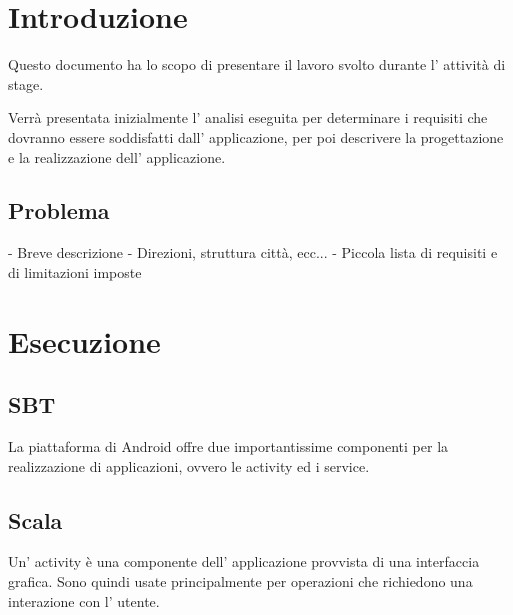 \documentclass{article}
\newcommand{\Versione}{1.0}
\begin{document}
\tableofcontents 
\listoftables
\listoffigures
\newpage

\pagestyle{fancy}

\chead{}
\rhead{
	\color{black}
	\bfseries \textsf{\normalsize v.\Versione\\} 
}
\section{Introduzione}
Questo documento ha lo scopo di presentare il lavoro svolto durante l\textquoteright{} attivit\`{a} di stage. 

Verr\`{a} presentata inizialmente l\textquoteright{} analisi eseguita per determinare i requisiti che dovranno essere soddisfatti dall\textquoteright{} applicazione, per poi descrivere la progettazione e la realizzazione dell\textquoteright{} applicazione.
\subsection{Problema}
- Breve descrizione \newline
- Direzioni, struttura città, ecc...\newline
- Piccola lista di requisiti e di limitazioni imposte \newline 
\newpage

\pagestyle{fancy}

\chead{}
\rhead{
	\color{black}
	\bfseries \textsf{\normalsize v.\Versione\\} 
}

\section{Esecuzione}
\subsection{SBT}
La piattaforma di Android offre due importantissime componenti per la realizzazione di applicazioni, ovvero le activity ed i service.
\subsection{Scala}
Un\textquoteright{} activity \`{e} una componente dell\textquoteright{} applicazione provvista di una interfaccia grafica. Sono quindi usate principalmente per operazioni che richiedono una interazione con l\textquoteright{} utente.
\end{document}

